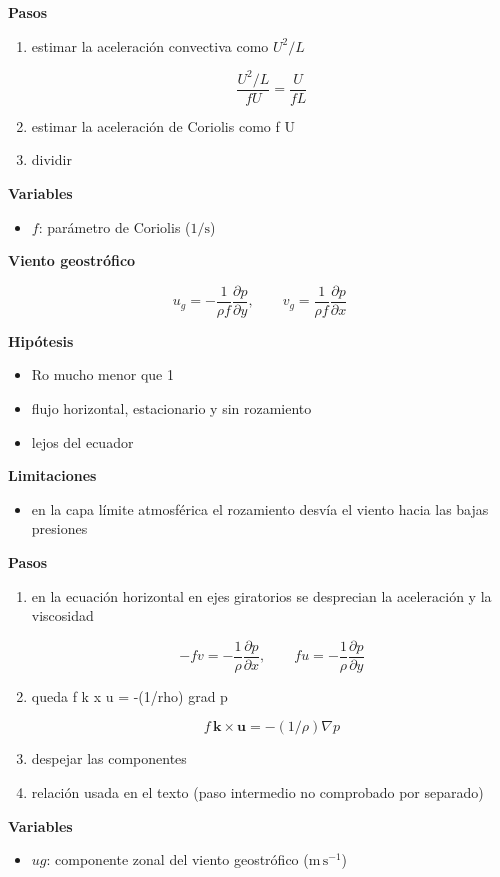 \documentclass[10pt,openany]{book}
\begin{document}
\begin{tcolorbox}[title={Desarrollos del modelo}, studiumdef, breakable]
\noindent\textbf{Pasos}
\begin{enumerate}
\item
estimar la aceleración convectiva como \(U^2/L\)

\[
\frac{U^{2}/L}{f U} = \frac{U}{f L}
\]
\item
estimar la aceleración de Coriolis como f U
\item
dividir
\end{enumerate}

\noindent\textbf{Variables}
\begin{itemize}
\item $f$: parámetro de Coriolis ($\mathrm{1/s}$)
\end{itemize}



\noindent\textbf{Viento geostrófico}

\[
u_g = -\frac{1}{\rho f}\frac{\partial p}{\partial y},\qquad v_g = \frac{1}{\rho f}\frac{\partial p}{\partial x}
\]

\noindent\textbf{Hipótesis}
\begin{itemize}
\item Ro mucho menor que 1
\item flujo horizontal, estacionario y sin rozamiento
\item lejos del ecuador
\end{itemize}

\noindent\textbf{Limitaciones}
\begin{itemize}
\item en la capa límite atmosférica el rozamiento desvía el viento hacia las bajas presiones
\end{itemize}

\noindent\textbf{Pasos}
\begin{enumerate}
\item
en la ecuación horizontal en ejes giratorios se desprecian la aceleración y la viscosidad

\[
-f v = -\frac{1}{\rho}\frac{\partial p}{\partial x},\qquad f u = -\frac{1}{\rho}\frac{\partial p}{\partial y}
\]
\item
queda f k x u = -(1/rho) grad p

\[
f\,\mathbf{k}\times\mathbf{u} = -(1/\rho)\nabla p
\]
\item
despejar las componentes
\item
relación usada en el texto (paso intermedio no comprobado por separado)
\end{enumerate}

\noindent\textbf{Variables}
\begin{itemize}
\item $ug$: componente zonal del viento geostrófico ($\mathrm{m}\,\mathrm{s}^{-1}$)
\end{itemize}


\end{tcolorbox}
\end{document}
